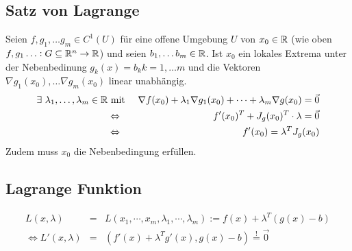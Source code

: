 \subsection{Satz von Lagrange}
Seien $f, g_1, \ldots g_m \in C^1(U)$ für eine offene Umgebung $U$ von $x_0 \in \mathbb{R}$
(wie oben $f,g_1 \ldots : G \subseteq \mathbb{R}^n \rightarrow \mathbb{R}$) und seien
$b_1, \ldots b_m \in \mathbb{R}$. Ist $x_0$ ein lokales Extrema unter der Nebenbedinung
$g_k(x) = b_k k=1,\ldots m$ und die Vektoren $\nabla g_1(x_0), \ldots \nabla g_m(x_0)$
linear unabhängig.
\begin{eqnarray*}
    \exists\  \lambda_1, \ldots, \lambda_m \in \mathbb{R} &\text{ mit }&
    \nabla f(x_0) + \lambda_1 \nabla g_1(x_0) + \cdots + \lambda_m \nabla g(x_0)
    = \vec{0} \\
    &\Leftrightarrow& f'(x_0)^T + J_g(x_0)^T \cdot \lambda = \vec{0} \\
    &\Leftrightarrow& f'(x_0) = \lambda^T J_g(x_0)
\end{eqnarray*}
Zudem muss $x_0$ die Nebenbedingung erfüllen.

\subsection{Lagrange Funktion}
\begin{eqnarray*}
    L(x,\lambda) &=& L(x_1, \cdots, x_m, \lambda_1, \cdots, \lambda_m)
    := f(x) + \lambda^T (g(x) - b) \\
    \Leftrightarrow L'(x,\lambda) &=& \left( f'(x) + \lambda^T g'(x), g(x)-b \right)
    \stackrel{!}{=} \vec{0}
\end{eqnarray*}
